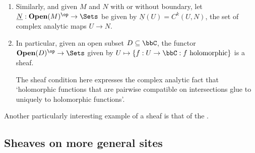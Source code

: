 \begin{example}
\begin{enumerate}
        \item Similarly, and given  $M$ and $N$ with or without boundary, let $\underline{N}: \mathbf{Open}(M)^{\op} \to \Sets$ be given by $\underline{N}(U) = C^k(U, N)$, the set of complex analytic maps $U \to N$.

        \item In particular, given an open subset $D \subseteq \bbC$, the functor $\mathbf{Open}(D)^{\op} \to \Sets$ given by $U \mapsto \{f: U \to \bbC: f \text{ holomorphic}\}$ is a sheaf.

        The sheaf condition here expresses the complex analytic fact that `holomorphic functions that are pairwise compatible on intersections glue to uniquely to holomorphic functions'.
    \end{enumerate}
\end{example}
















Another particularly interesting example of a sheaf is that of the .



\subsection{Sheaves on more general sites}

